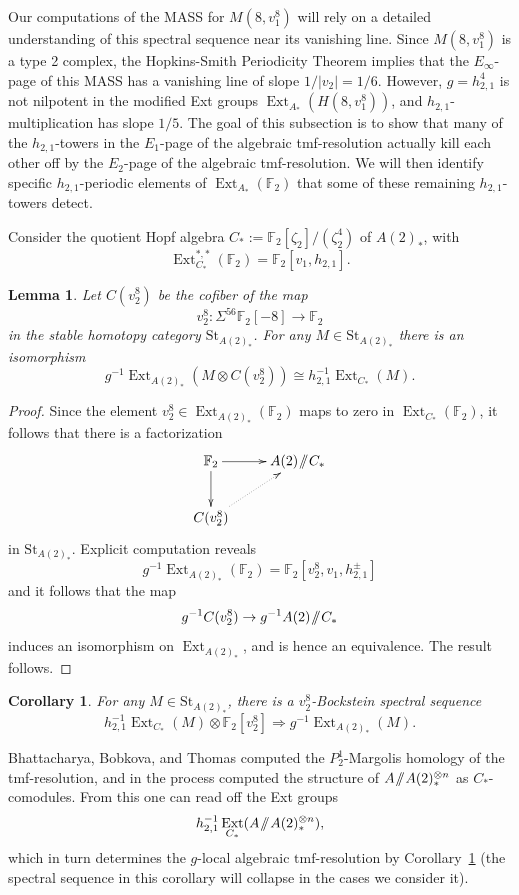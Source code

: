 \documentclass[10pt]{amsart}
\newcommand{\sslash}{\mathbin{/\mkern-6mu/}}
\newcommand{\mmod}{\! \sslash \!}
\newcommand{\mr}[1]{\mathrm{#1}}
\newcommand{\abs}[1]{\lvert #1 \rvert}
\newcommand{\FF}{\mathbb{F}}
\newcommand{\tmf}{\mathrm{tmf}}
\newcommand{\St}{\mr{St}}
\newtheorem{cor}[equation]{Corollary}
\newtheorem{lem}[equation]{Lemma}
\theoremstyle{definition}
\numberwithin{equation}{section}
\numberwithin{figure}{section}
\DeclareMathOperator{\Ext}{Ext}
\begin{document}
Our computations of the MASS for $M(8,v_1^8)$ will rely on a detailed understanding of this spectral sequence near its vanishing line.  Since $M(8,v_1^8)$ is a type 2 complex, the Hopkins-Smith Periodicity Theorem \cite{HopkinsSmith} implies that the $E_\infty$-page of this MASS has a vanishing line of slope $1/\abs{v_2} = 1/6$.  However, $g = h_{2,1}^4$ is not nilpotent in the modified Ext groups $\Ext_{A_*}(H(8,v_1^8))$, and $h_{2,1}$-multiplication has slope $1/5$.  The goal of this subsection is to show that many of the $h_{2,1}$-towers in the $E_1$-page of the algebraic tmf-resolution actually kill each other off by the $E_2$-page of the algebraic tmf-resolution.  We will then identify specific $h_{2,1}$-periodic elements of $\Ext_{A_*}(\FF_2)$ that some of these remaining $h_{2,1}$-towers detect.

Consider the quotient Hopf algebra $C_* := \FF_2[\zeta_2]/(\zeta_2^4)$ of $A(2)_*$, with
$$ \Ext^{*,*}_{C_*}(\FF_2) = \FF_2[v_1, h_{2,1}]. $$

\begin{lem}\label{lem:glocal}
Let $C(v_2^8)$ be the cofiber of the map
$$ v_2^8: \Sigma^{56}\FF_2[-8] \rightarrow \FF_2 $$
in the stable homotopy category $\St_{A(2)_*}$.
For any $M \in \St_{A(2)_*}$ there is an isomorphism 
$$ g^{-1}\Ext_{A(2)_*}(M \otimes C(v_2^8)) \cong h^{-1}_{2,1}\Ext_{C_*}(M). $$  
\end{lem}

\begin{proof}
Since the element $v_2^8 \in \Ext_{A(2)_*}(\FF_2)$ maps to zero in $\Ext_{C_*}(\FF_2)$, it follows that there is a factorization
$$
\xymatrix{
\FF_2 \ar[r] \ar[d] &
A(2)\mmod C_* \\
C(v_2^8) \ar@{.>}[ur]
}
$$
in $\St_{A(2)_*}$.
Explicit computation reveals
$$ g^{-1}\Ext_{A(2)_*}(\FF_2) = \FF_2[v_2^8,v_1, h^{\pm}_{2,1}] $$
and it follows that the map
$$ g^{-1} C(v_2^8) \rightarrow g^{-1} A(2)\mmod C_* $$
induces an isomorphism on $\Ext_{A(2)_*}$, and is hence an equivalence.  The result follows.
\end{proof}

\begin{cor}\label{cor:P21ss}
For any $M \in \St_{A(2)_*}$, there is a $v_2^8$-Bockstein spectral sequence
$$ h^{-1}_{2,1}\Ext_{C_*}(M)\otimes \FF_2[v_2^8] \Rightarrow g^{-1}\Ext_{A(2)_*}(M). $$
\end{cor}


Bhattacharya, Bobkova, and Thomas \cite{BBT} computed the $P_2^1$-Margolis homology of the tmf-resolution, and in the process computed the structure of $A \mmod A(2)^{\otimes n}_*$ as $C_*$-comodules.  From this one can read off the Ext groups
$$ h_{2,1}^{-1}\Ext_{C_*}(A \mmod A(2)^{\otimes n}_*), $$
which in turn determines the $g$-local algebraic $\tmf$-resolution by Corollary~\ref{cor:P21ss} (the spectral sequence in this corollary will collapse in the cases we consider it).
\end{document}
